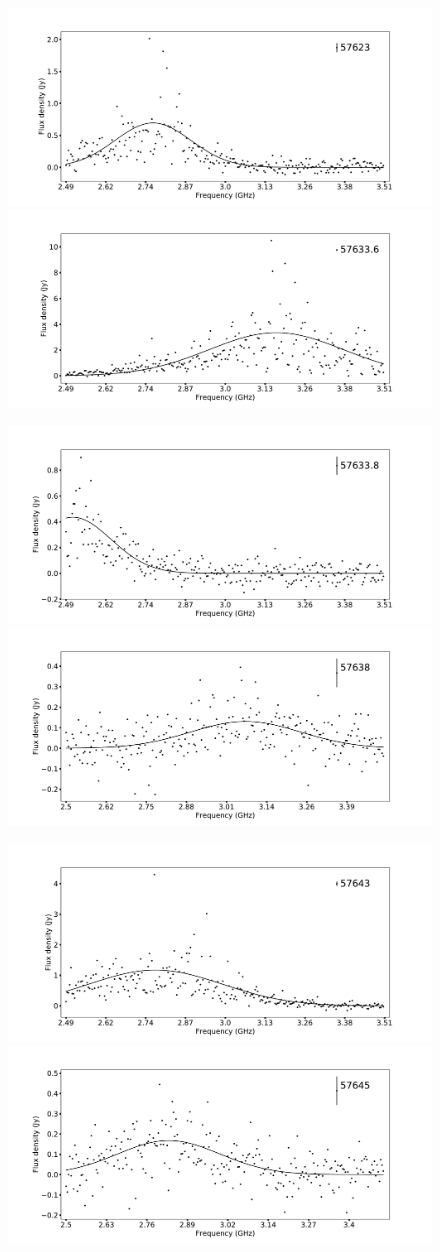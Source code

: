 \documentclass[twocolumn]{aastex61}
\begin{document}
\begin{figure}[ht]
\begin{center}
 \begin{minipage}{2\columnwidth}
  \includegraphics[width=0.5\columnwidth]{spec_57623.pdf}
  \includegraphics[width=0.5\columnwidth]{spec_57633.6.pdf}
 \end{minipage}

 \begin{minipage}{2\columnwidth}
  \includegraphics[width=0.5\columnwidth]{spec_57633.8.pdf}
  \includegraphics[width=0.5\columnwidth]{spec_57638.pdf}
 \end{minipage}

 \begin{minipage}{2\columnwidth}
  \includegraphics[width=0.5\columnwidth]{spec_57643.pdf}
  \includegraphics[width=0.5\columnwidth]{spec_57645.pdf}
 \end{minipage}


\end{center}
\end{figure}
\end{document}
